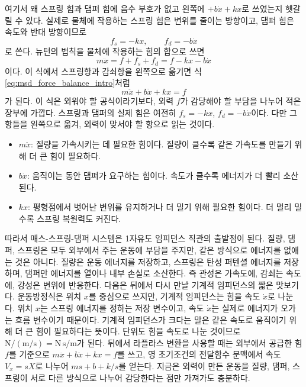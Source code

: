 여기서 왜 스프링 힘과 댐퍼 힘에 음수 부호가 없고 왼쪽에 $+b\dot{x}+kx$로 쓰였는지 헷갈릴 수 있다.
실제로 물체에 작용하는 스프링 힘은 변위를 줄이는 방향이고, 댐퍼 힘은 속도와 반대 방향이므로
\begin{equation}
  f_s=-kx, \qquad f_d=-b\dot{x}
\end{equation}
로 쓴다.
뉴턴의 법칙을 물체에 작용하는 힘의 합으로 쓰면
\begin{equation}
  m\ddot{x}=f+f_s+f_d
  =
  f-kx-b\dot{x}
\end{equation}
이다.
이 식에서 스프링항과 감쇠항을 왼쪽으로 옮기면 식 \eqref{eq:msd_force_balance_intro}처럼
\begin{equation}
  m\ddot{x}+b\dot{x}+kx=f
\end{equation}
가 된다.
이 식은 외워야 할 공식이라기보다, 외력 $f$가 감당해야 할 부담을 나누어 적은 장부에 가깝다.
스프링과 댐퍼의 실제 힘은 여전히 $f_s=-kx$, $f_d=-b\dot{x}$이다.
다만 그 항들을 왼쪽으로 옮겨, 외력이 맞서야 할 항으로 읽는 것이다.
\begin{itemize}
  \item $m\ddot{x}$: 질량을 가속시키는 데 필요한 힘이다. 질량이 클수록 같은 가속도를 만들기 위해 더 큰 힘이 필요하다.
  \item $b\dot{x}$: 움직이는 동안 댐퍼가 요구하는 힘이다. 속도가 클수록 에너지가 더 빨리 소산된다.
  \item $kx$: 평형점에서 벗어난 변위를 유지하거나 더 밀기 위해 필요한 힘이다. 더 멀리 밀수록 스프링 복원력도 커진다.
\end{itemize}

따라서 매스-스프링-댐퍼 시스템은 1자유도 임피던스 직관의 출발점이 된다.
질량, 댐퍼, 스프링은 모두 외부에서 주는 운동에 부담을 주지만, 같은 방식으로 에너지를 없애는 것은 아니다.
질량은 운동 에너지를 저장하고, 스프링은 탄성 퍼텐셜 에너지를 저장하며, 댐퍼만 에너지를 열이나 내부 손실로 소산한다.
즉 관성은 가속도에, 감쇠는 속도에, 강성은 변위에 반응한다.
다음은 뒤에서 다시 만날 기계적 임피던스의 짧은 맛보기다.
운동방정식은 위치 $x$를 중심으로 쓰지만, 기계적 임피던스는 힘을 속도 $\dot{x}$로 나눈다.
위치 $x$는 스프링 에너지를 정하는 저장 변수이고, 속도 $\dot{x}$는 실제로 에너지가 오가는 흐름 변수이기 때문이다.
기계적 임피던스가 크다는 말은 같은 속도로 움직이기 위해 더 큰 힘이 필요하다는 뜻이다.
단위도 힘을 속도로 나눈 것이므로 $\mathrm{N}/(\mathrm{m/s})=\mathrm{N\,s/m}$가 된다.
뒤에서 라플라스 변환을 사용할 때는 외부에서 공급한 힘 $f$를 기준으로 $m\ddot{x}+b\dot{x}+kx=f$를 쓰고, 영 초기조건의 전달함수 문맥에서 속도 $V_x=sX$로 나누어 $ms+b+k/s$를 얻는다.
지금은 외력이 만든 운동을 질량, 댐퍼, 스프링이 서로 다른 방식으로 나누어 감당한다는 점만 가져가도 충분하다.

